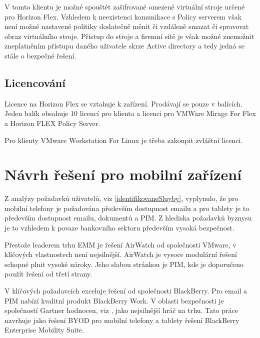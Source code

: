 V tomto klientu je možné spouštět zašifrované omezené virtuální stroje určené pro Horizon Flex. Vzhledem k neexistenci komunikace s Policy serverem však není možné nastavené politiky dodatečně měnit či vzdáleně smazat či spravovat obraz virtuálního stroje. Přístup do stroje a firemní sítě je však možné znemožnit zneplatněním přístupu daného uživatele skrze Active directory a tedy jedná se stále o bezpečné řešení.

\subsection{Licencování}
Licence na Horizon Flex se vztahuje k zařízení. Prodávají se pouze v balících. Jeden balík obsahuje 10 licencí pro klienta a licenci pro VMWare Mirage For Flex a Horizon FLEX Policy Server.

Pro klienty VMware Workstation For Linux je třeba zakoupit zvláštní licenci.


\section{Návrh řešení pro mobilní zařízení}

Z analýzy požadavků uživatelů, viz \ref{identifikovaneSluyby}, vyplynulo, že pro mobilní telefony je požadována především dostupnost emailu a pro tablety je to především dostupnost emailu, dokumentů a PIM. Z hlediska požadavků byznysu je to vzhledem k povaze bankovního sektoru především vysoká bezpečnost.

Přestože leaderem trhu EMM je řešení AirWatch od společnosti VMware, v klíčových vlastnostech není nejsilnější. AirWatch je vysoce modulární řešení schopné plnit vysoké nároky. Jeho slabou stránkou je PIM, kde je doporučeno použít řešení od třetí strany.

V klíčových požadavcích exceluje řešení od společnosti BlackBerry. Pro email a PIM nabízí kvalitní produkt BlackBerry Work. V oblasti bezpečnosti je společností Gartner hodnocen, viz \cite{GartnerSecurity}, jako nejsilnější hráč na trhu. %
Tato práce navrhuje jako řešení BYOD pro mobilní telefony a tablety řešení BlackBerry Enterprise Mobility Suite.


